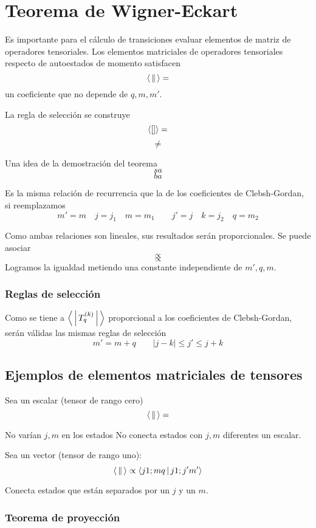 \documentclass[10pt,oneside]{CBFT_book}
\begin{document}
\chapter{Teorema de Wigner-Eckart}

Es importante para el cálculo de transiciones evaluar elementos de matriz de operadores tensoriales.
Los elementos matriciales de operadores tensoriales respecto de autoestados de momento satisfacen 
\[
	\Braket{||} =
\]
un coeficiente que no depende de $q,m,m'$.

La regla de selección se construye 
\[
	\Braket{[]} =
\]
\[
	\neq
\]

Una idea de la demostración del teorema
\[
	sa
\]
\[
	ba
\]

Es la misma relación de recurrencia que la de los coeficientes de Clebsh-Gordan, si reemplazamos
\[
	m'=m \quad j=j_1 \quad m=m_1 \qquad j'=j \quad k=j_2 \quad q=m_2
\]

Como ambas relaciones son lineales, sus resultados serán proporcionales.
Se puede asociar 
\[
	\propto 
\]
\[
	\propto
\]
Logramos la igualdad metiendo una constante independiente de $m',q,m$.

\subsection{Reglas de selección}

Como se tiene a $\Braket{|T_q^{(k)}|}$ proporcional a los coeficientes de Clebsh-Gordan, serán válidas las 
mismas reglas de selección 
\[
	m' = m + q \qquad |j-k| \leq j' \leq j+k
\]

\section{Ejemplos de elementos matriciales de tensores}

Sea un escalar (tensor de rango cero)
\[
	\Braket{||} =
\]

No varían $j,m$ en los estados No conecta estados con $j,m$ diferentes un escalar.

Sea un vector (tensor de rango uno):
\[
	\Braket{||} \propto \Braket{j 1;m q|j 1;j' m'}
\]

Conecta estados que están separados por un $j$ y un $m$.

\subsection{Teorema de proyección}
\end{document}
